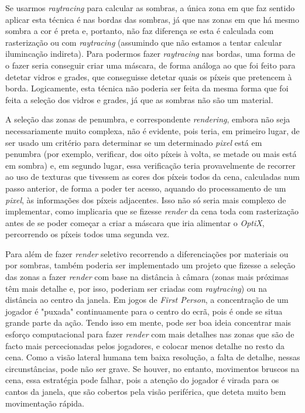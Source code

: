 \documentclass[10pt]{article}
\begin{document}
Se usarmos \textit{raytracing} para calcular as sombras, a única zona em que faz sentido aplicar esta técnica é nas bordas das sombras, já que nas zonas em que há mesmo sombra a cor é preta e, portanto, não faz diferença se esta é calculada com rasterização ou com \textit{raytracing} (assumindo que não estamos a tentar calcular ilumincação indireta). Para podermos fazer \textit{raytracing} nas bordas, uma forma de o fazer seria conseguir criar uma máscara, de forma análoga ao que foi feito para detetar vidros e grades, que conseguisse detetar quais os píxeis que pretencem à borda. Logicamente, esta técnica não poderia ser feita da mesma forma que foi feita a seleção dos vidros e grades, já que as sombras não são um material.

A seleção das zonas de penumbra, e correspondente \textit{rendering}, embora não seja necessariamente muito complexa, não é evidente, pois teria, em primeiro lugar, de ser usado um critério para determinar se um determinado \textit{pixel} está em penumbra (por exemplo, verificar, dos oito píxeis à volta, se metade ou mais está em sombra) e, em segundo lugar, essa verificação teria provavelmente de recorrer ao uso de texturas que tivessem as cores dos píxeis todos da cena, calculadas num passo anterior, de forma a poder ter acesso, aquando do processamento de um \textit{pixel}, às informações dos píxeis adjacentes. Isso não só seria mais complexo de implementar, como implicaria que se fizesse \textit{render} da cena toda com rasterização antes de se poder começar a criar a máscara que iria alimentar o \textit{OptiX}, percorrendo os píxeis todos uma segunda vez.

Para além de fazer \textit{render} seletivo recorrendo a diferenciações por materiais ou por sombras, também poderia ser implementado um projeto que fizesse a seleção das zonas a fazer \textit{render} com base na distância à câmara (zonas mais próximas têm mais detalhe e, por isso, poderiam ser criadas com \textit{raytracing}) ou na distância ao centro da janela. Em jogos de \textit{First Person}, a concentração de um jogador é "puxada" continuamente para o centro do ecrã, pois é onde se situa grande parte da ação. Tendo isso em mente, pode ser boa ideia concentrar mais esforço computacional para fazer \textit{render} com mais detalhes nas zonas que são de facto mais percecionadas pelos jogadores, e colocar menos detalhe no resto da cena. Como a visão lateral humana tem baixa resolução, a falta de detalhe, nessas circunstâncias, pode não ser grave. Se houver, no entanto, movimentos bruscos na cena, essa estratégia pode falhar, pois a atenção do jogador é virada para os cantos da janela, que são cobertos pela visão periférica, que deteta muito bem movimentação rápida.
\end{document}
